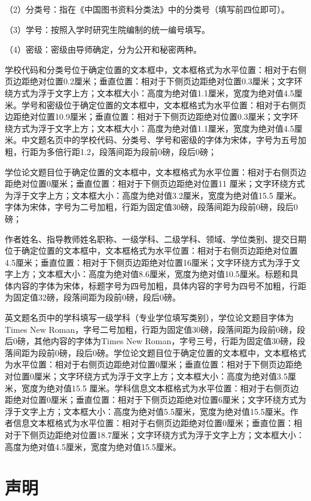 （2）分类号：指在《中国图书资料分类法》中的分类号（填写前四位即可）。

（3）学号：按照入学时研究生院编制的统一编号填写。

（4）密级：密级由导师确定，分为公开和秘密两种。

学校代码和分类号位于确定位置的文本框中，文本框格式为水平位置：相对于右侧页边距绝对位置0.2厘米；垂直位置：相对于下侧页边距绝对位置0.3厘米；文字环绕方式为浮于文字上方；文本框大小：高度为绝对值1.1厘米，宽度为绝对值4.5厘米。学号和密级位于确定位置的文本框中，文本框格式为水平位置：相对于右侧页边距绝对位置10.9厘米；垂直位置：相对于下侧页边距绝对位置0.3厘米；文字环绕方式为浮于文字上方；文本框大小：高度为绝对值1.1厘米，宽度为绝对值4.5厘米。中文题名页中的学校代码、分类号、学号和密级的字体为宋体，字号为五号加粗，行距为多倍行距1.2，段落间距为段前0磅，段后0磅；

学位论文题目位于确定位置的文本框中，文本框格式为水平位置：相对于右侧页边距绝对位置0厘米；垂直位置：相对于下侧页边距绝对位置11 厘米；文字环绕方式为浮于文字上方；文本框大小：高度为绝对值3.2厘米，宽度为绝对值15.5 厘米。字体为宋体，字号为二号加粗，行距为固定值30磅，段落间距为段前0磅，段后0磅；

作者姓名、指导教师姓名职称、一级学科、二级学科、领域、学位类别、提交日期位于确定位置的文本框中，文本框格式为水平位置：相对于右侧页边距绝对位置4.5厘米；垂直位置：相对于下侧页边距绝对位置16厘米；文字环绕方式为浮于文字上方；文本框大小：高度为绝对值8.6厘米，宽度为绝对值10.5厘米。标题和具体内容的字体为宋体，标题字号为四号加粗，具体内容的字号为四号不加粗，行距为固定值32磅，段落间距为段前0磅，段后0磅。

英文题名页中的学科填写一级学科（专业学位填写类别），学位论文题目字体为Times New Roman，字号二号加粗，行距为固定值30磅，段落间距为段前0磅，段后0磅，其他内容的字体为Times New Roman，字号三号，行距为固定值30磅，段落间距为段前0磅，段后0磅。学位论文题目位于确定位置的文本框中，文本框格式为水平位置：相对于右侧页边距绝对位置0厘米；垂直位置：相对于下侧页边距绝对位置0厘米；文字环绕方式为浮于文字上方；文本框大小：高度为绝对值3.5厘米，宽度为绝对值15.5 厘米。学科信息文本框格式为水平位置：相对于右侧页边距绝对位置0厘米；垂直位置：相对于下侧页边距绝对位置6厘米；文字环绕方式为浮于文字上方；文本框大小：高度为绝对值5.5厘米，宽度为绝对值15.5厘米。作者信息文本框格式为水平位置：相对于右侧页边距绝对位置0厘米；垂直位置：相对于下侧页边距绝对位置18.7厘米；文字环绕方式为浮于文字上方；文本框大小：高度为绝对值4.5厘米，宽度为绝对值15.5厘米。

\section{声明}

